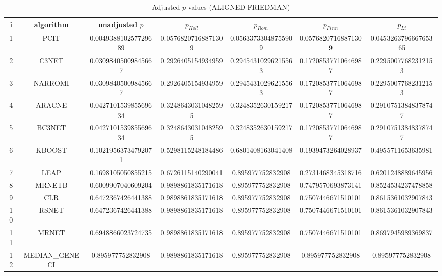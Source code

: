 \documentclass[a4paper,10pt]{article}
\begin{document}
\begin{landscape}
\begin{table}[!htp]
\centering\scriptsize
\caption{Adjusted $p$-values (ALIGNED FRIEDMAN)}
\begin{tabular}{ccccccc}
i&algorithm&unadjusted $p$&$p_{Holl}$&$p_{Rom}$&$p_{Finn}$&$p_{Li}$\\
\hline
1&PCIT&0.004938810257729689&0.05768207168871309&0.05633733048755909&0.05768207168871309&0.045326379666765365\\
2&C3NET&0.03098405009845667&0.2926405154934959&0.29454310296215563&0.17208537710646987&0.22950077682312153\\
3&NARROMI&0.03098405009845667&0.2926405154934959&0.29454310296215563&0.17208537710646987&0.22950077682312153\\
4&ARACNE&0.042710153985569634&0.32486430310482595&0.3248352630159217&0.17208537710646987&0.29107513848378747\\
5&BC3NET&0.042710153985569634&0.32486430310482595&0.3248352630159217&0.17208537710646987&0.29107513848378747\\
6&KBOOST&0.10219563734792071&0.5298115248184486&0.6801408163041408&0.1939473264028937&0.4955711653635981\\
7&LEAP&0.1698105050855215&0.6726115140290041&0.895977752832908&0.2731468345318716&0.6201248889645956\\
8&MRNETB&0.6009907040609204&0.9898861835171618&0.895977752832908&0.7479570693873141&0.8524534237478858\\
9&CLR&0.6472367426441388&0.9898861835171618&0.895977752832908&0.7507446671510101&0.8615361032907843\\
10&RSNET&0.6472367426441388&0.9898861835171618&0.895977752832908&0.7507446671510101&0.8615361032907843\\
11&MRNET&0.6948866023724735&0.9898861835171618&0.895977752832908&0.7507446671510101&0.8697945989369837\\
12&MEDIAN_GENECI&0.895977752832908&0.9898861835171618&0.895977752832908&0.895977752832908&0.895977752832908\\
\hline
\end{tabular}
\end{table}


\newpage


\end{landscape}
\end{document}
